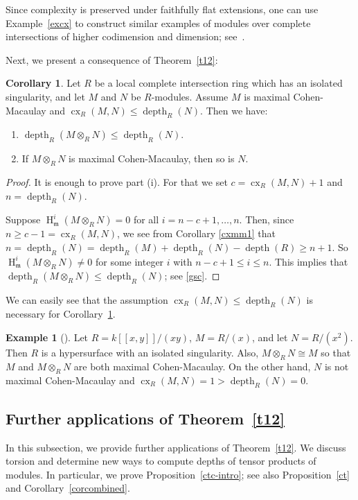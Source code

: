 \documentclass[11pt]{amsart}
\theoremstyle{definition}
\newtheorem{cor}[thm]{Corollary}
\theoremstyle{definition}
\newtheorem{eg}[thm]{Example}
\numberwithin{equation}{section}
\newcommand{\fm}{\mathfrak{m}}
\DeclareMathOperator{\cx}{cx}
\DeclareMathOperator{\depth}{depth}
\DeclareMathOperator{\hh}{H}
\begin{document}
Since complexity is preserved under faithfully flat extensions, one can use Example~\ref{excx} to construct similar examples of modules over complete intersections of higher codimension and dimension; see~\cite[4.2.5(2)]{Av2}.

Next, we present a consequence of Theorem~\ref{t12}:

\begin{cor} \label{cxmm2} Let $R$ be a local complete intersection ring which has an isolated singularity, and let $M$ and $N$ be $R$-modules. Assume $M$ is maximal Cohen-Macaulay and $\cx_R(M,N)\leq \depth_R(N)$. Then we have:
\begin{enumerate}[\rm(i)]
\item $\depth_R(M\otimes_RN)\leq\depth_R(N)$.
\item If $M\otimes_RN$ is maximal Cohen-Macaulay, then so is $N$.
\end{enumerate}
\end{cor}

\begin{proof} It is enough to prove part (i). For that we set $c=\cx_R(M,N)+1$ and $n=\depth_R(N)$. 

Suppose $\hh^i_{\fm}(M\otimes_RN)=0$ for all $i=n-c+1, \ldots, n$. Then, since $n\geq c-1=\cx_R(M,N)$, we see from Corollary \ref{cxmm1} that $n=\depth_{R}(N)=\depth_{R}(M)+\depth_{R}(N)-\depth(R)\geq n+1$. So $\hh^i_{\fm}(M\otimes_RN)\neq0$ for some integer $i$ with $n-c+1 \leq i \leq n$. This implies that $\depth_R(M\otimes_RN)\leq\depth_R(N)$; see \ref{gsc}.
\end{proof}

We can easily see that the assumption $\cx_R(M,N)\leq \depth_R(N)$ is necessary for Corollary~\ref{cxmm2}.

\begin{eg} [{\cite[page 164]{HW2}}] Let $R=k[\![x,y]\!]/(xy)$, $M=R/(x)$, and let $N=R/(x^2)$. Then $R$ is a hypersurface with an isolated singularity. Also, $M\otimes_RN \cong M$ so that $M$ and $M\otimes_RN$ are both maximal Cohen-Macaulay. On the other hand, $N$ is not maximal Cohen-Macaulay and $\cx_R(M,N)=1>\depth_R(N)=0$.
\end{eg}


\subsection*{Further applications of Theorem~\ref{t12}} In this subsection, we provide further applications of Theorem~\ref{t12}. We discuss torsion and determine new ways to compute depths of tensor products of modules. In particular, we prove  Proposition~\ref{ctc-intro}; see also Proposition~\ref{ct} and Corollary~\ref{corcombined}. %
\end{document}
